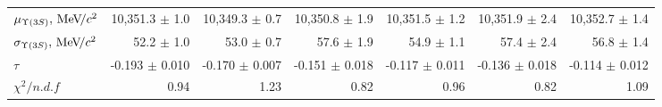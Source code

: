 \begin{table}[H]
{{\begin{tabular}{lrrrrrr}
\rule{0pt}{4ex}$\mu_{\Y3S}, \mevcc$ & 10,351.3 $\pm$ 1.0 & 10,349.3 $\pm$ 0.7 & 10,350.8 $\pm$ 1.9 & 10,351.5 $\pm$ 1.2 & 10,351.9 $\pm$ 2.4 & 10,352.7 $\pm$ 1.4\\
$\sigma_{\Y3S}, \mevcc$ & 52.2 $\pm$ 1.0 & 53.0 $\pm$ 0.7 & 57.6 $\pm$ 1.9 & 54.9 $\pm$ 1.1 & 57.4 $\pm$ 2.4 & 56.8 $\pm$ 1.4\\

\rule{0pt}{4ex}$\tau$ & -0.193 $\pm$ 0.010 & -0.170 $\pm$ 0.007 & -0.151 $\pm$ 0.018 & -0.117 $\pm$ 0.011 & -0.136 $\pm$ 0.018 & -0.114 $\pm$ 0.012\\

\rule{0pt}{4ex}$\chi^2 / n.d.f$ & 0.94 & 1.23 & 0.82 & 0.96 & 0.82 & 1.09\\
\bottomrule
\end{tabular}
} %

} %
\label{tab:upsilon:result:fits}
\end{table}
